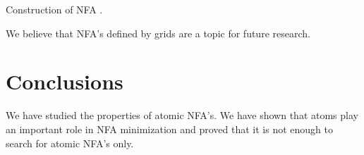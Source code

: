\documentclass{llncs}
\begin{document}
\begin{table}
\caption{Construction of NFA .}
\label{tab:con_mp}
\begin{center}

\end{center}
\end{table}



We believe that NFA's defined by grids are a topic for future research.


\section{Conclusions}
\label{sec:conc}
We have studied the properties of atomic NFA's.
We have shown that atoms play an important role in NFA minimization and
proved that it is not enough to search for atomic NFA's only.
\end{document}
